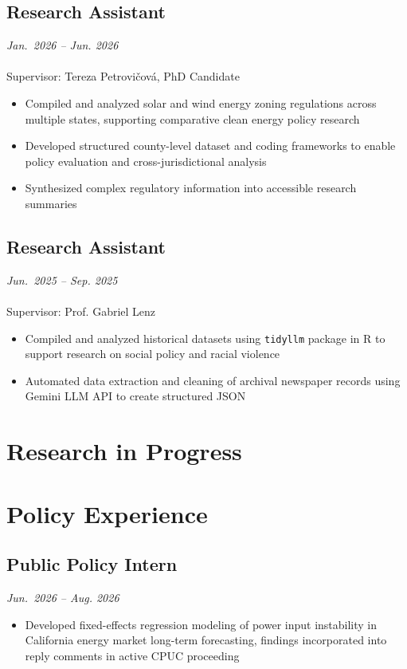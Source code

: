 \documentclass[11pt]{article}
\begin{document}
\subsection{Research Assistant}
\noindent\textit{Jan.\ 2026 -- Jun. 2026} \\
 \\
\noindent Supervisor: Tereza Petrovičová, PhD Candidate
\begin{itemize}
\item Compiled and analyzed solar and wind energy zoning regulations across multiple states, supporting comparative clean energy policy research
\item Developed structured county-level dataset and coding frameworks to enable policy evaluation and cross-jurisdictional analysis
\item Synthesized complex regulatory information into accessible research summaries
\end{itemize}

\subsection{Research Assistant}
\noindent\textit{Jun.\ 2025 -- Sep. 2025} \\
 \\
\noindent Supervisor: Prof. Gabriel Lenz
\begin{itemize}
\item Compiled and analyzed historical datasets using \texttt{tidyllm} package in R to support research on social policy and racial violence
\item Automated data extraction and cleaning of archival newspaper records using Gemini LLM API to create structured JSON
\end{itemize}

\section{Research in Progress}

\noindent {}

\section{Policy Experience}

\subsection{Public Policy Intern}
\noindent\textit{Jun.\ 2026 -- Aug. 2026} \\
\begin{itemize}
\item Developed fixed-effects regression modeling of power input instability in California energy market long-term forecasting, findings incorporated into reply comments in active CPUC proceeding
\end{itemize}
\end{document}
